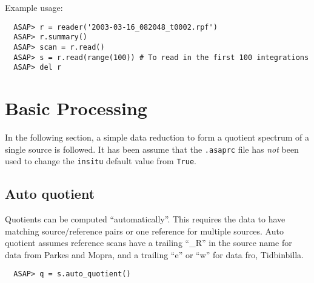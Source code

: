 \documentclass[11pt]{article}
\newcommand{\cmd}[1]{{\tt #1}}
\begin{document}
Example usage:

\begin{verbatim}
  ASAP> r = reader('2003-03-16_082048_t0002.rpf')
  ASAP> r.summary()
  ASAP> scan = r.read()
  ASAP> s = r.read(range(100)) # To read in the first 100 integrations
  ASAP> del r
\end{verbatim}

\section{Basic Processing}

In the following section, a simple data reduction to form a quotient
spectrum of a single source is followed.  It has been assume that the
\cmd{.asaprc} file has {\em not} been used to change the \cmd{insitu}
default value from \cmd{True}.

\subsection{Auto quotient}
Quotients can be computed ``automatically''. This
requires the data to have matching source/reference pairs or one
reference for multiple sources. Auto quotient assumes reference scans
have a trailing ``\_R'' in the source name for data from Parkes and
Mopra, and a trailing ``e'' or ``w'' for data fro, Tidbinbilla.

\begin{verbatim}
  ASAP> q = s.auto_quotient()
\end{verbatim}
\end{document}
